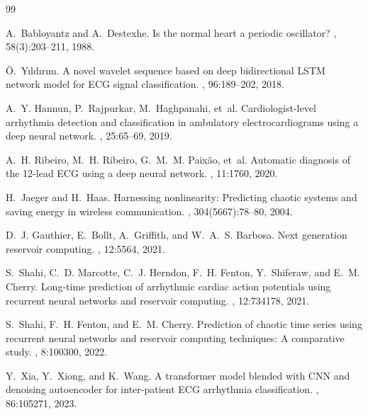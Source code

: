 \begin{thebibliography}{99}

A.~Babloyantz and A.~Destexhe.
\newblock Is the normal heart a periodic oscillator?
, 58(3):203--211, 1988.

{\"O}.~Y{\i}ld{\i}r{\i}m.
\newblock A novel wavelet sequence based on deep bidirectional {LSTM} network
  model for {ECG} signal classification.
, 96:189--202, 2018.

A.~Y. Hannun, P.~Rajpurkar, M.~Haghpanahi, et~al.
\newblock Cardiologist-level arrhythmia detection and classification in
  ambulatory electrocardiograms using a deep neural network.
, 25:65--69, 2019.

A.~H. Ribeiro, M.~H. Ribeiro, G.~M.~M. Paix{\~a}o, et~al.
\newblock Automatic diagnosis of the 12-lead {ECG} using a deep neural network.
, 11:1760, 2020.

H.~Jaeger and H.~Haas.
\newblock Harnessing nonlinearity: Predicting chaotic systems and saving energy
  in wireless communication.
, 304(5667):78--80, 2004.

D.~J. Gauthier, E.~Bollt, A.~Griffith, and W.~A.~S. Barbosa.
\newblock Next generation reservoir computing.
, 12:5564, 2021.

S.~Shahi, C.~D. Marcotte, C.~J. Herndon, F.~H. Fenton, Y.~Shiferaw, and
  E.~M. Cherry.
\newblock Long-time prediction of arrhythmic cardiac action potentials using
  recurrent neural networks and reservoir computing.
, 12:734178, 2021.

S.~Shahi, F.~H. Fenton, and E.~M. Cherry.
\newblock Prediction of chaotic time series using recurrent neural networks and
  reservoir computing techniques: A comparative study.
, 8:100300, 2022.

Y.~Xia, Y.~Xiong, and K.~Wang.
\newblock A transformer model blended with {CNN} and denoising autoencoder for
  inter-patient {ECG} arrhythmia classification.
, 86:105271, 2023.


\end{thebibliography}
